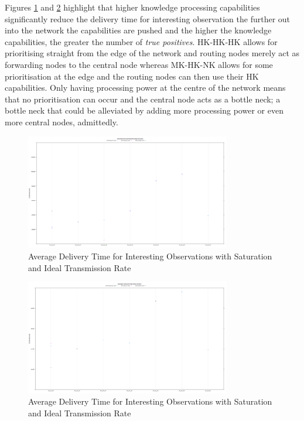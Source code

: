 	Figures \ref{fig:sim:res:saturated:ideal:tpfp} and \ref{fig:sim:res:saturated:ideal:tnfn} highlight that higher knowledge processing capabilities significantly reduce the delivery time for interesting observation the further out into the network the capabilities are pushed and the higher the knowledge capabilities, the greater the number of \textit{true positives}. HK-HK-HK allows for prioritising straight from the edge of the network and routing nodes merely act as forwarding nodes to the central node whereas MK-HK-NK allows for some prioritisation at the edge and the routing nodes can then use their HK capabilities. Only having processing power at the centre of the network means that no prioritisation can occur and the central node acts as a bottle neck; a bottle neck that could be alleviated by adding more processing power or even more central nodes, admittedly.

	\begin{figure}[h]
	\centering
	\includegraphics[width=0.8\textwidth]{Chap7/figures/plots/saturated_ideal/tpvsfp_delivered.png}
	\caption{Average Delivery Time for Interesting Observations with Saturation and Ideal Transmission Rate}
	\label{fig:sim:res:saturated:ideal:tpfp}
	\end{figure}

	\begin{figure}[h]
	\centering
	\includegraphics[width=0.8\textwidth]{Chap7/figures/plots/saturated_ideal/tnvsfn_delivered.png}
	\caption{Average Delivery Time for Interesting Observations with Saturation and Ideal Transmission Rate}
	\label{fig:sim:res:saturated:ideal:tnfn}
	\end{figure}

